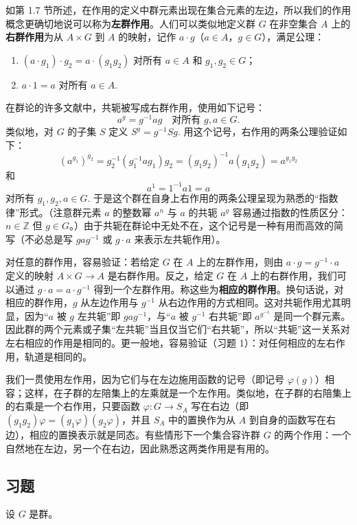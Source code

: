 如第 1.7 节所述，在作用的定义中群元素出现在集合元素的左边，所以我们的作用概念更确切地说可以称为\textbf{左群作用}。人们可以类似地定义群 \(G\) 在非空集合 \(A\) 上的\textbf{右群作用}为从 \(A \times G\) 到 \(A\) 的映射，记作 \(a \cdot g\)（\(a \in A\)，\(g \in G\)），满足公理：
\begin{enumerate}[label=(\arabic*)]
\item \((a \cdot g_1) \cdot g_2 = a \cdot (g_1 g_2)\) 对所有 \(a \in A\) 和 \(g_1, g_2 \in G\)；
\item \(a \cdot 1 = a\) 对所有 \(a \in A\).
\end{enumerate}

在群论的许多文献中，共轭被写成右群作用，使用如下记号：
\[
a^g = g^{-1}ag \quad \text{对所有 } g, a \in G.
\]
类似地，对 \(G\) 的子集 \(S\) 定义 \(S^g = g^{-1}Sg\). 用这个记号，右作用的两条公理验证如下：
\[
(a^{g_1})^{g_2} = g_2^{-1}(g_1^{-1}ag_1)g_2 = (g_1g_2)^{-1}a(g_1g_2) = a^{g_1g_2}
\]
和
\[
a^1 = 1^{-1}a1 = a
\]
对所有 \(g_1, g_2, a \in G\). 于是这个群在自身上右作用的两条公理呈现为熟悉的“指数律”形式。（注意群元素 \(a\) 的整数幂 \(a^n\) 与 \(a\) 的共轭 \(a^g\) 容易通过指数的性质区分：\(n \in \mathbb{Z}\) 但 \(g \in G\)。）由于共轭在群论中无处不在，这个记号是一种有用而高效的简写（不必总是写 \(gag^{-1}\) 或 \(g \cdot a\) 来表示左共轭作用）。

对任意的群作用，容易验证：若给定 \(G\) 在 \(A\) 上的左群作用，则由 \(a \cdot g = g^{-1} \cdot a\) 定义的映射 \(A \times G \to A\) 是右群作用。反之，给定 \(G\) 在 \(A\) 上的右群作用，我们可以通过 \(g \cdot a = a \cdot g^{-1}\) 得到一个左群作用。称这些为\textbf{相应的群作用}。换句话说，对相应的群作用，\(g\) 从左边作用与 \(g^{-1}\) 从右边作用的方式相同。这对共轭作用尤其明显，因为“\(a\) 被 \(g\) 左共轭”即 \(gag^{-1}\)，与“\(a\) 被 \(g^{-1}\) 右共轭”即 \(a^{g^{-1}}\) 是同一个群元素。因此群的两个元素或子集“左共轭”当且仅当它们“右共轭”，所以“共轭”这一关系对左右相应的作用是相同的。更一般地，容易验证（习题 1）：对任何相应的左右作用，轨道是相同的。

我们一贯使用左作用，因为它们与在左边施用函数的记号（即记号 \(\varphi(g)\)）相容；这样，在子群的左陪集上的左乘就是一个左作用。类似地，在子群的右陪集上的右乘是一个右作用，只要函数 \(\varphi : G \to S_A\) 写在右边（即 \((g_1g_2)\varphi = (g_1\varphi)(g_2\varphi)\)，并且 \(S_A\) 中的置换作为从 \(A\) 到自身的函数写在右边），相应的置换表示就是同态。有些情形下一个集合容许群 \(G\) 的两个作用：一个自然地在左边，另一个在右边，因此熟悉这两类作用是有用的。

\subsection*{习题}
设 \(G\) 是群。

